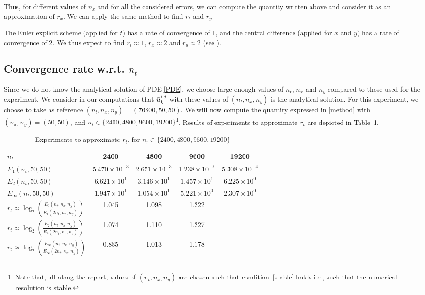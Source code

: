 \documentclass{article}
\begin{document}
Thus, for different values of $n_x$ and for all the considered errors, we can compute the quantity written above and consider it as an approximation of $r_x$. We can apply the same method to find $r_t$ and $r_y$. 

The Euler explicit scheme (applied for $t$) has a rate of convergence of $1$, and the central difference (applied for $x$ and $y$) has a rate of convergence of $2$. We thus expect to find $r_t \approx 1$, $r_x \approx 2$ and $r_y \approx 2$ (see \cite[Section~3.6.6]{book}).

\subsection{Convergence rate w.r.t. $n_t$}

Since we do not know the analytical solution of PDE \eqref{PDE}, we choose large enough values of $n_t$, $n_x$ and $n_y$ compared to those used for the experiment. We consider in our computations that $\Tilde{u}_k^{i, j}$ with these values of $(n_t, n_x, n_y)$ is the analytical solution. For this experiment, we choose to take as reference $(n_t, n_x, n_y) = (76800, 50, 50)$. We will now compute the quantity expressed in \eqref{method} with $(n_x, n_y) = (50, 50)$, and $n_t \in \{ 2400, 4800, 9600, 19200 \}$\footnote{Note that, all along the report, values of $(n_t, n_x, n_y)$ are chosen such that condition~\eqref{stable} holds i.e., such that the numerical resolution is stable.}. Results of experiments to approximate $r_t$ are depicted in Table~\ref{tab:texp}.
\begin{table}[h!]
\centering
\begin{tabular}{lcccc}
\hline
$n_t$ & 2400 & 4800 & 9600 & 19200 \\ \hline
$E_1(n_t, 50, 50)$ & $5.470 \times 10^{-3}$ & $2.651 \times 10^{-3}$ & $1.238 \times 10^{-3}$ & $5.308 \times 10^{-4}$ \\
$E_2(n_t, 50, 50)$ & $6.621 \times 10^{1}$ & $3.146 \times 10^{1}$ & $1.457 \times 10^{1}$ & $6.225 \times 10^{0}$ \\
$E_\infty(n_t, 50, 50)$ & $1.947 \times 10^{1}$ & $1.054 \times 10^{1}$ & $5.221 \times 10^{0}$ & $2.307 \times 10^{0}$ \\ \hline
$ r_t \approx \log_2\left( \frac{E_1(n_t, n_x, n_y)}{E_1(2n_t, n_x, n_y)} \right) $ & 1.045 & 1.098 & 1.222 &  \\
$ r_t \approx \log_2\left( \frac{E_2(n_t, n_x, n_y)}{E_2(2n_t, n_x, n_y)} \right) $ & 1.074 & 1.110 & 1.227 &  \\
$ r_t \approx \log_2\left( \frac{E_\infty(n_t, n_x, n_y)}{E_\infty(2n_t, n_x, n_y)} \right) $ & 0.885 & 1.013 & 1.178 &  \\ \hline
\end{tabular}
\caption{Experiments to approximate $r_t$, for $n_t \in \{ 2400, 4800, 9600, 19200 \}$}
\label{tab:texp}
\end{table}
\end{document}
